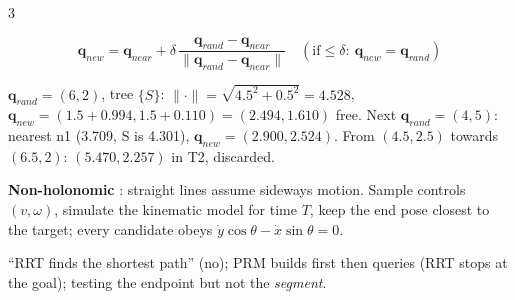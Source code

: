 \begin{multicols}{3}
\begin{fbx}
\[\mathbf q_{new}=\mathbf q_{near}+\delta\,\frac{\mathbf q_{rand}-\mathbf q_{near}}{\lVert\mathbf q_{rand}-\mathbf q_{near}\rVert}\quad(\text{if}\le\delta:\ \mathbf q_{new}=\mathbf q_{rand})\]
\end{fbx}
\begin{worked}[SAMPLE 6b: RRT, practical map, $\delta=1$]
$\mathbf q_{rand}=(6,2)$, tree $\{S\}$: $\lVert\cdot\rVert=\sqrt{4.5^2+0.5^2}=4.528$, $\mathbf q_{new}=(1.5+0.994,1.5+0.110)=(\mathbf{2.494},\mathbf{1.610})$ free. Next $\mathbf q_{rand}=(4,5)$: nearest n1 (3.709, S is 4.301), $\mathbf q_{new}=(\mathbf{2.900},\mathbf{2.524})$. From $(4.5,2.5)$ towards $(6.5,2)$: $(5.470,2.257)$ in T2, discarded. \chk
\end{worked}
\textbf{Non-holonomic} : straight lines assume sideways motion. Sample controls $(v,\omega)$, simulate the kinematic model for time $T$, keep the end pose closest to the target; every candidate obeys $\dot y\cos\theta-\dot x\sin\theta=0$.
\begin{trap}
``RRT finds the shortest path'' (no); PRM builds first then queries (RRT stops at the goal); testing the endpoint but not the \emph{segment}.
\end{trap}


\end{multicols}
